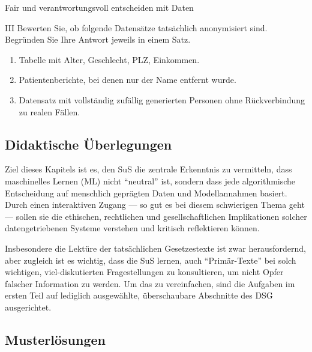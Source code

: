 \begin{lpu}{Fair und verantwortungsvoll entscheiden mit Daten}
\begin{aufgabe}{III}
Bewerten Sie, ob folgende Datensätze tatsächlich anonymisiert sind. Begründen Sie Ihre Antwort jeweils in einem Satz.

\begin{enumerate}
  \item Tabelle mit Alter, Geschlecht, PLZ, Einkommen.
  \item Patientenberichte, bei denen nur der Name entfernt wurde.
  \item Datensatz mit vollständig zufällig generierten Personen ohne Rückverbindung zu realen Fällen.
\end{enumerate}
\end{aufgabe}

\end{lpu}

\subsection*{Didaktische Überlegungen}

Ziel dieses Kapitels ist es, den SuS die zentrale Erkenntnis zu vermitteln, dass maschinelles Lernen (ML) nicht ``neutral'' ist, sondern dass jede algorithmische Entscheidung auf menschlich geprägten Daten und Modellannahmen basiert. Durch einen interaktiven Zugang — so gut es bei diesem schwierigen Thema geht — sollen sie die ethischen, rechtlichen und gesellschaftlichen Implikationen solcher datengetriebenen Systeme verstehen und kritisch reflektieren können. 

Insbesondere die Lektüre der tatsächlichen Gesetzestexte ist zwar herausfordernd, aber zugleich ist es wichtig, dass die SuS lernen, auch ``Primär-Texte'' bei solch wichtigen, viel-diskutierten Fragestellungen zu konsultieren, um nicht Opfer falscher Information zu werden. Um das zu vereinfachen, sind die Aufgaben im ersten Teil auf lediglich ausgewählte, überschaubare Abschnitte des DSG ausgerichtet.

\subsection*{Musterlösungen}

